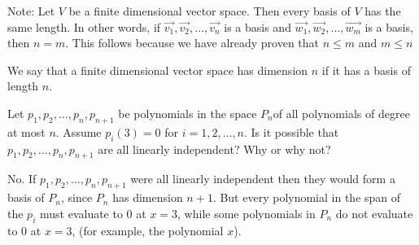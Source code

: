 \documentclass{ximera}
\begin{document}
 
 	Note: Let $V$ be a finite dimensional vector space.  Then  every basis of $V$ has the same length.  In other words, if
 	$\vec{v_1},\vec{v_2}, \ldots, \vec{v_n}$ is a basis and	$\vec{w_1},\vec{w_2}, \ldots, \vec{w_m}$ is a basis, then $n=m$.  This follows because we have already proven
 	that $n\leq m$ and $m\leq n$
  
  \begin{definition}
  	We say that a finite dimensional vector space has dimension $n$ if it has a basis of length $n$.
  \end{definition}
  
  	Let $p_1,p_2,\ldots,p_n,p_{n+1}$ be polynomials in the space $P_n$of all polynomials of degree at most $n$.  Assume $p_i(3) = 0$ for $i=1,2,\ldots,n$.  Is it possible that
  	$p_1,p_2,\ldots,p_n,p_{n+1}$ are all linearly independent?  Why or why not?
\begin{free-response}
	No.  If $p_1,p_2,\ldots,p_n,p_{n+1}$ were all linearly independent then they would form a basis of $P_n$, since $P_n$ has dimension $n+1$.  
	But every polynomial in the span of the $p_i$ must evaluate to $0$ at $x=3$, while some polynomials in $P_n$ do not evaluate to $0$ at $x=3$,  (for example, the polynomial $x$).
\end{free-response}  
\end{document}
